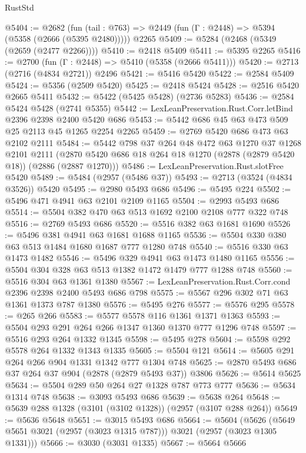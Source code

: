 \begin{lexlean}{RustStd}
\begin{coremodule}
@5404 := @2682
    (fun (tail : @763) => @2449 (fun (Γ : @2448) => @5394 (@5358 (@2666 (@5395 @2480)))))
    @2265
@5409 := @5284 (@2468 (@5349 (@2659 (@2477 @2266))))
@5410 := @2418 @5409
@5411 := @5395 @2265
@5416 := @2700 (fun (Γ : @2448) => @5410 (@5358 (@2666 @5411)))
@5420 := @2713 (@2716 (@4834 @2721)) @2496
@5421 := @5416 @5420
@5422 := @2584 @5409
@5424 := @5356 (@2509 @5420)
@5425 := @2418 @5424
@5428 := @2516 @5420 @2665 @5411
@5432 := @5422 (@5425 @5428) (@2736 @5283)
@5436 := @2584 @5424 @5428 (@2741 @5355)
@5442 := LexLeanPreservation.Rust.Corr.letBind @2396 @2398 @2400 @5420 @686
@5453 := @5442 @686 @45 @63 @473 @509 @25 @2113 @45 @1265 @2254 @2265
@5459 := @2769 @5420 @686 @473 @63 @2102 @2111
@5484 := @5442
    @798
    @37
    @264
    @48
    @472
    @63
    @1270
    @37
    @1268
    @2101
    @2111
    (@2870 @5420 @686 @18 @264 @18 @1270 (@2878 (@2879 @5420 @18)) (@2886 (@2887 @1270)))
@5486 := LexLeanPreservation.Rust.slotFree @5420
@5489 := @5484 (@2957 (@5486 @37))
@5493 := @2713 (@3524 (@4834 @3526)) @5420
@5495 := @2980 @5493 @686
@5496 := @5495 @224
@5502 := @5496 @471 @4941 @63 @2101 @2109 @1165
@5504 := @2993 @5493 @686
@5514 := @5504 @382 @470 @63 @513 @1692 @2100 @2108 @777 @322 @748
@5516 := @2769 @5493 @686
@5520 := @5516 @382 @63 @1681 @1690
@5526 := @5496 @381 @4941 @63 @1681 @1688 @1165
@5536 := @5504 @330 @380 @63 @513 @1484 @1680 @1687 @777 @1280 @748
@5540 := @5516 @330 @63 @1473 @1482
@5546 := @5496 @329 @4941 @63 @1473 @1480 @1165
@5556 := @5504 @304 @328 @63 @513 @1382 @1472 @1479 @777 @1288 @748
@5560 := @5516 @304 @63 @1361 @1380
@5567 := LexLeanPreservation.Rust.Corr.cond @2396 @2398 @2400 @5493 @686 @798
@5575 := @5567 @296 @302 @71 @63 @1361 @1373 @787 @1380
@5576 := @5495 @276
@5577 := @5576 @295
@5578 := @265 @266
@5583 := @5577 @5578 @116 @1361 @1371 @1363
@5593 := @5504 @293 @291 @264 @266 @1347 @1360 @1370 @777 @1296 @748
@5597 := @5516 @293 @264 @1332 @1345
@5598 := @5495 @278
@5604 := @5598 @292 @5578 @264 @1332 @1343 @1335
@5605 := @5504 @121
@5614 := @5605 @291 @264 @266 @904 @1331 @1342 @777 @1304 @748
@5625 := @2870 @5493 @686 @37 @264 @37 @904 (@2878 (@2879 @5493 @37)) @3806
@5626 := @5614 @5625
@5634 := @5504 @289 @50 @264 @27 @1328 @787 @773 @777
@5636 := @5634 @1314 @748
@5638 := @3093 @5493 @686
@5639 := @5638 @264
@5648 := @5639 @288 @1328 (@3101 (@3102 @1328)) (@2957 (@3107 @288 @264))
@5649 := @5636 @5648
@5651 := @3015 @5493 @686
@5664 := @5604
    (@5626 (@5649 @5651 @3021 (@2957 (@3023 @1315 @787))) @3021 (@2957 (@3023 @1305 @1331)))
@5666 := @3030 (@3031 @1335)
@5667 := @5664 @5666

\end{coremodule}
\end{lexlean}
